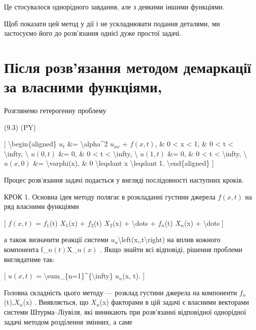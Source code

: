 \documentclass[
]{article}
\begin{document}
{{Це стосувалося однорідного завдання, але з деякими іншими функціями.

Щоб показати цей метод у дії і не ускладнювати подання деталями, ми
застосуємо його до розв'язання однієї дуже простої задачі.

\section{Після розв'язання методом демаркації за власними
функціями,}\label{ux43fux456ux441ux43bux44f-ux440ux43eux437ux432ux44fux437ux430ux43dux43dux44f-ux43cux435ux442ux43eux434ux43eux43c-ux434ux435ux43cux430ux440ux43aux430ux446ux456ux457-ux437ux430-ux432ux43bux430ux441ux43dux438ux43cux438-ux444ux443ux43dux43aux446ux456ux44fux43cux438}

Розглянемо гетерогенну проблему

(9.3) (PY)

{[} \textbackslash begin\{aligned\} \(u_t\) \&=
\textbackslash alpha\^{}2 \(u_{xx}\) + \(f(x, t)\), \& 0 \textless{} x
\textless{} 1, \& 0 \textless{} t \textless{} \textbackslash infty,
\textbackslash{} \(u(0, t)\) \&= 0, \& 0 \textless{} t \textless{}
\textbackslash infty, \textbackslash{} \(u(1, t)\) \&= 0, \& 0
\textless{} t \textless{} \textbackslash infty, \textbackslash{}
\(u(x, 0)\) \&= \textbackslash varphi(x), \& 0 \textbackslash leqslant x
\textbackslash leqslant 1. \textbackslash end\{aligned\} {]}

Процес розв'язання задачі подається у вигляді послідовності наступних
кроків.

КРОК 1. Основна ідея методу полягає в розкладанні густини джерела
\(f(x, t)\) на ряд власними функціями

{[} \(f(x, t)\) = \(f_1\)(t) \(X_1\)(x) + \(f_2\)(t) \(X_2\)(x) +
\textbackslash dots + \(f_n\)(t) \(X_n\)(x) + \textbackslash dots {]}

а також визначити реакції системи
\(u_n\)\textbackslash left(x,,t\textbackslash right) на вплив кожного
компонента f\_\(n\left(t\right)\)X\_\(n\left(x\right)\) . Якщо знайти
всі відповіді, рішення проблеми виглядатиме так:

{[} \(u(x, t)\) =
\textbackslash sum\_\{n=1\}\^{}\{\textbackslash infty\} \(u_n\)(x, t).
{]}

Головна складність цього методу --- розклад густини джерела на
компоненти \(f_n\)(t),\(X_n\)(x) . Виявляється, що \(X_n\)(x) факторами
в цій задачі є власними векторами системи Штурма--Ліувіля, які виникають
при розв'язанні відповідної однорідної задачі методом розділення
змінних, а саме

}}
\end{document}
